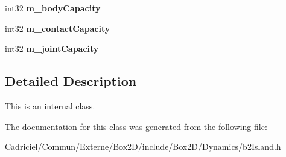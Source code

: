 \begin{DoxyCompactItemize}
\item 
int32 {\bfseries m\+\_\+body\+Capacity}\hypertarget{classb2_island_a5ea371889bb93fb6387ff2ab427191ed}{}\label{classb2_island_a5ea371889bb93fb6387ff2ab427191ed}

\item 
int32 {\bfseries m\+\_\+contact\+Capacity}\hypertarget{classb2_island_a1a65b8fc8256ca443f85e6ae6f2d841a}{}\label{classb2_island_a1a65b8fc8256ca443f85e6ae6f2d841a}

\item 
int32 {\bfseries m\+\_\+joint\+Capacity}\hypertarget{classb2_island_a9b6e63c89307d469e1075585d65a9bbb}{}\label{classb2_island_a9b6e63c89307d469e1075585d65a9bbb}

\end{DoxyCompactItemize}


\subsection{Detailed Description}
This is an internal class. 

The documentation for this class was generated from the following file\+:\begin{DoxyCompactItemize}
\item 
Cadriciel/\+Commun/\+Externe/\+Box2\+D/include/\+Box2\+D/\+Dynamics/b2\+Island.\+h\end{DoxyCompactItemize}
